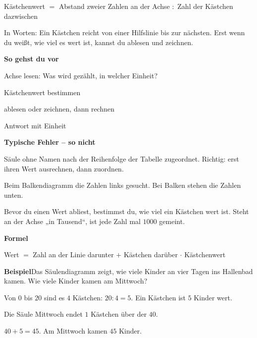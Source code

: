 \documentclass[11pt]{article}
\newcommand{\nr}[1]{\makebox[7mm][l]{\textbf{#1}}}
\begin{document}
\begin{tcolorbox}[colback=mbkasten,colframe=mbgrau,boxrule=0.5pt,arc=1mm,left=3mm,right=3mm,top=2mm,bottom=2mm,title={\bfseries Formel auf einen Blick},coltitle=black,colbacktitle=black!10]
{\Large Kästchenwert $=$ Abstand zweier Zahlen an der Achse $:$ Zahl der Kästchen dazwischen}\par\medskip
In Worten: Ein Kästchen reicht von einer Hilfslinie bis zur nächsten. Erst wenn du weißt, wie viel es wert ist, kannst du ablesen und zeichnen.\par\medskip
\textbf{So gehst du vor}\par
\nr{1}Achse lesen: Was wird gezählt, in welcher Einheit?\par
\nr{2}Kästchenwert bestimmen\par
\nr{3}ablesen oder zeichnen, dann rechnen\par
\nr{4}Antwort mit Einheit\par
\medskip
\end{tcolorbox}
\medskip\noindent\textbf{Typische Fehler – so nicht}\par\smallskip
\noindent\nr{$\times$}Säule ohne Namen nach der Reihenfolge der Tabelle zugeordnet. Richtig: erst ihren Wert ausrechnen, dann zuordnen.\par
\noindent\nr{$\times$}Beim Balkendiagramm die Zahlen links gesucht. Bei Balken stehen die Zahlen unten.\par
\clearpage\label{s:A}\noindent\colorbox{black!12}{}\hspace{3mm}{\Large\bfseries Säulen ablesen}\par\smallskip
\noindent Bevor du einen Wert abliest, bestimmst du, wie viel ein Kästchen wert ist. Steht an der Achse „in Tausend“, ist jede Zahl mal $1000$ gemeint.\par\medskip
\noindent\textbf{Formel}\par\nopagebreak\noindent\hspace*{4mm}\begin{minipage}{\dimexpr\linewidth-4mm\relax}Wert $=$ Zahl an der Linie darunter $+$ Kästchen darüber $\cdot$ Kästchenwert\end{minipage}\par\medskip
\noindent\textbf{Beispiel}\quad Das Säulendiagramm zeigt, wie viele Kinder an vier Tagen ins Hallenbad kamen. Wie viele Kinder kamen am Mittwoch?\par\smallskip
\noindent\begin{minipage}[t]{0.6\linewidth}\vspace{0pt}\par\noindent{}Von $0$ bis $20$ sind es $4$ Kästchen: $20 : 4 = 5$. Ein Kästchen ist $5$ Kinder wert.\par\smallskip\par\noindent{}Die Säule Mittwoch endet $1$ Kästchen über der $40$.\par\smallskip\par\noindent{}$40 + 5 = 45$. Am Mittwoch kamen $45$ Kinder.\par\smallskip\end{minipage}\hfill
\end{document}
